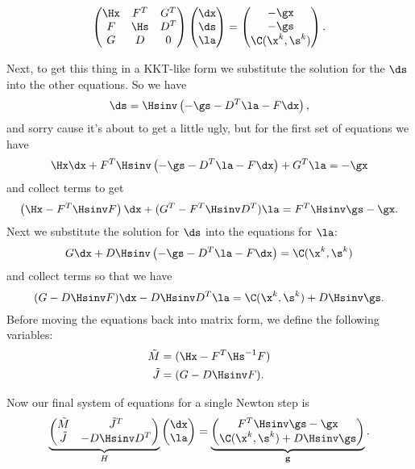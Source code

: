 \begin{equation}
\begin{pmatrix}
\Hx & F^T & G^T \\
F & \Hs & D^T\\
G & D & 0
\end{pmatrix}
\begin{pmatrix}
\dx \\
\ds \\
\la
\end{pmatrix} =
\begin{pmatrix}
-\gx \\
-\gs \\
\C (\x^k, \s^k)
\end{pmatrix}.
\end{equation}

Next, to get this thing in a KKT-like form we substitute the solution for the $\ds$ into the other equations. So we have
\begin{equation}
\ds = \Hsinv \left(-\gs - D^T \la - F\dx \right),
\end{equation}
and sorry cause it's about to get a little ugly, but for the first set of equations we have
\begin{equation*}
\Hx\dx + F^T\Hsinv \left(-\gs - D^T\la - F\dx \right) +G^T \la = -\gx
\end{equation*}
and collect terms to get
\begin{equation}
\left(\Hx - F^T\Hsinv F \right)\dx + (G^T - F^T\Hsinv D^T)\la = 
F^T\Hsinv \gs -\gx.
\end{equation}
Next we substitute the solution for $\ds$ into the equations for $\la$:
\begin{equation*}
G\dx + D\Hsinv \left(-\gs - D^T\la - F\dx\right) = \C (\x^k, \s^k)
\end{equation*}
and collect terms so that we have
\begin{equation}
(G - D\Hsinv F)\dx - D\Hsinv D^T\la = \C (\x^k, \s^k) + D\Hsinv\gs.
\end{equation}
Before moving the equations back into matrix form, we define the following variables:
\begin{align}
\tilde{M} &= (\Hx - F^T\Hs^{-1}F) \\
\tilde{J} &= (G - D\Hsinv F). 
\end{align}

Now our final system of equations for a single Newton step is
\begin{equation}
\underbrace{
\begin{pmatrix}
\tilde{M} & \tilde{J}^T \\
\tilde{J} & -D\Hsinv D^T 
\end{pmatrix}
}_H
\begin{pmatrix}
\dx \\
\la
\end{pmatrix} =
\underbrace{
\begin{pmatrix}
F^T\Hsinv\gs -\gx \\
\C (\x^k, \s^k) + D\Hsinv\gs
\end{pmatrix}
}_\mathbf{g} .
\end{equation}

